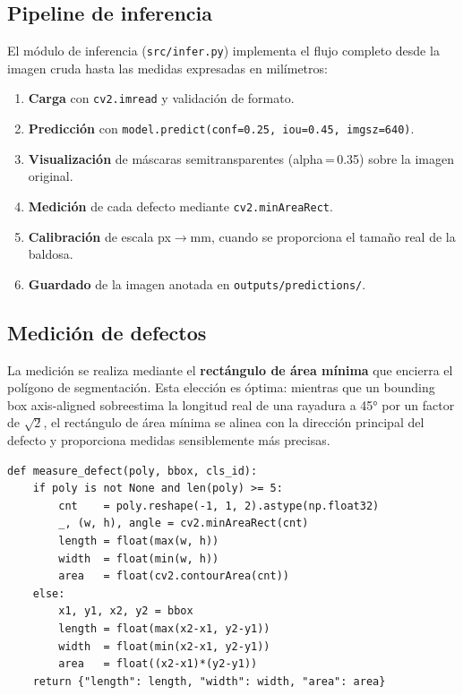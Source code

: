 \documentclass[12pt,a4paper]{article}
\begin{document}
\subsection{Pipeline de inferencia}

El módulo de inferencia (\texttt{src/infer.py}) implementa el flujo completo desde
la imagen cruda hasta las medidas expresadas en milímetros:

\begin{enumerate}
  \item \textbf{Carga} con \texttt{cv2.imread} y validación de formato.
  \item \textbf{Predicción} con \texttt{model.predict(conf=0.25, iou=0.45, imgsz=640)}.
  \item \textbf{Visualización} de máscaras semitransparentes (alpha\,=\,0.35) sobre la imagen original.
  \item \textbf{Medición} de cada defecto mediante \texttt{cv2.minAreaRect}.
  \item \textbf{Calibración} de escala px$\to$mm, cuando se proporciona el tamaño real de la baldosa.
  \item \textbf{Guardado} de la imagen anotada en \texttt{outputs/predictions/}.
\end{enumerate}

\subsection{Medición de defectos}

La medición se realiza mediante el \textbf{rectángulo de área mínima} que encierra el
polígono de segmentación. Esta elección es óptima: mientras que un bounding box
axis-aligned sobreestima la longitud real de una rayadura a 45° por un factor de
$\sqrt{2}$, el rectángulo de área mínima se alinea con la dirección principal del
defecto y proporciona medidas sensiblemente más precisas.

\begin{lstlisting}[caption={Función \texttt{measure\_defect()} en \texttt{src/infer.py}}]
def measure_defect(poly, bbox, cls_id):
    if poly is not None and len(poly) >= 5:
        cnt    = poly.reshape(-1, 1, 2).astype(np.float32)
        _, (w, h), angle = cv2.minAreaRect(cnt)
        length = float(max(w, h))
        width  = float(min(w, h))
        area   = float(cv2.contourArea(cnt))
    else:
        x1, y1, x2, y2 = bbox
        length = float(max(x2-x1, y2-y1))
        width  = float(min(x2-x1, y2-y1))
        area   = float((x2-x1)*(y2-y1))
    return {"length": length, "width": width, "area": area}
\end{lstlisting}
\end{document}
